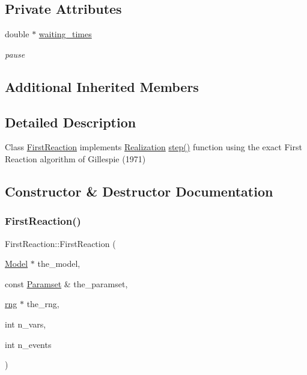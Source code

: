 \subsection*{Private Attributes}
\begin{DoxyCompactItemize}
\item 
\mbox{\label{class_first_reaction_adef190a1cb589cc8317b469f94cd6ad4}} 
double $\ast$ \hyperlink{class_first_reaction_adef190a1cb589cc8317b469f94cd6ad4}{waiting\+\_\+times}
\begin{DoxyCompactList}\small\item\em pause \end{DoxyCompactList}\end{DoxyCompactItemize}
\subsection*{Additional Inherited Members}


\subsection{Detailed Description}
Class \hyperlink{class_first_reaction}{First\+Reaction} implements \hyperlink{class_realization}{Realization} \hyperlink{class_first_reaction_aed63c3c95d20b2ad557dabb6c5376a73}{step()} function using the exact First Reaction algorithm of Gillespie (1971) 

\subsection{Constructor \& Destructor Documentation}
\mbox{\label{class_first_reaction_a5122d48f6ecbe17a75cecd41b06ac4a2}} 
\subsubsection{\texorpdfstring{First\+Reaction()}{FirstReaction()}}
{\footnotesize\ttfamily First\+Reaction\+::\+First\+Reaction (\begin{DoxyParamCaption}\item[{\hyperlink{class_model}{Model} $\ast$}]{the\+\_\+model,  }\item[{const \hyperlink{class_paramset}{Paramset} \&}]{the\+\_\+paramset,  }\item[{\hyperlink{classrng}{rng} $\ast$}]{the\+\_\+rng,  }\item[{int}]{n\+\_\+vars,  }\item[{int}]{n\+\_\+events }\end{DoxyParamCaption})}



